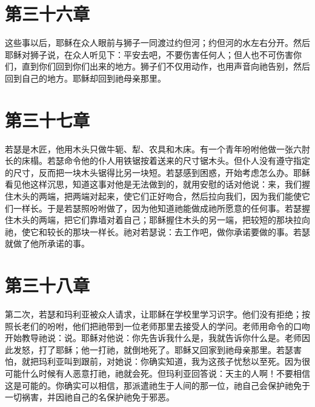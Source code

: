 \section{第三十六章}

这些事以后，耶稣在众人眼前与狮子一同渡过约但河；约但河的水左右分开。然后耶稣对狮子说，在众人听见下：平安去吧，不要伤害任何人；但人也不可伤害你们，直到你们回到你们出来的地方。狮子们不仅用动作，也用声音向祂告别，然后回到自己的地方。耶稣却回到祂母亲那里。\par


\section{第三十七章}

若瑟是木匠，他用木头只做牛轭、犁、农具和木床。有一个青年吩咐他做一张六肘长的床榻。若瑟命令他的仆人用铁锯按着送来的尺寸锯木头。但仆人没有遵守指定的尺寸，反而把一块木头锯得比另一块短。若瑟感到困惑，开始考虑怎么办。耶稣看见他这样沉思，知道这事对他是无法做到的，就用安慰的话对他说：来，我们握住木头的两端，把两端对起来，使它们正好吻合，然后拉向我们，因为我们能使它们一样长。于是若瑟照吩咐做了，因为他知道祂能做成祂所愿意的任何事。若瑟握住木头的两端，把它们靠墙对着自己；耶稣握住木头的另一端，把较短的那块拉向祂，使它和较长的那块一样长。祂对若瑟说：去工作吧，做你承诺要做的事。若瑟就做了他所承诺的事。\par


\section{第三十八章}

第二次，若瑟和玛利亚被众人请求，让耶稣在学校里学习识字。他们没有拒绝；按照长老们的吩咐，他们把祂带到一位老师那里去接受人的学问。老师用命令的口吻开始教导祂说：说。耶稣对他说：你先告诉我什么是，我就告诉你什么是。老师因此发怒，打了耶稣；他一打祂，就倒地死了。耶稣又回家到祂母亲那里。若瑟害怕，就把玛利亚叫到跟前，对她说：你确实知道，我为这孩子忧愁以至死。因为很可能什么时候有人恶意打祂，祂就会死。但玛利亚回答说：天主的人啊！不要相信这是可能的。你确实可以相信，那派遣祂生于人间的那一位，祂自己会保护祂免于一切祸害，并因祂自己的名保护祂免于邪恶。\par

